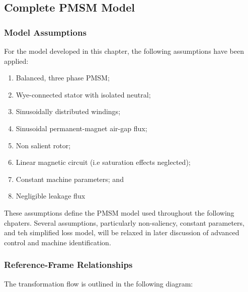 \documentclass{article}
\begin{document}
\subsection{Complete PMSM Model}

\subsubsection{Model Assumptions}

For the model developed in this chapter, the following assumptions have been applied:

\begin{enumerate}
    \item Balanced, three phase PMSM;
    \item Wye-connected stator with isolated neutral;
    \item Sinusoidally distributed windings;
    \item Sinusoidal permanent-magnet air-gap flux;
    \item Non salient rotor;
    \item Linear magnetic circuit (i.e saturation effects neglected);
    \item Constant machine parameters; and
    \item Negligible leakage flux
\end{enumerate}

These assumptions define the PMSM model used throughout the following chpaters. Several assumptions, particularly non-saliency, constant parameters, and teh simplified loss model, will be relaxed in later discussion of advanced control and machine identification.


\subsubsection{Reference-Frame Relationships}

The transformation flow is outlined in the following diagram:

\begin{center}
\end{center}
\end{document}
